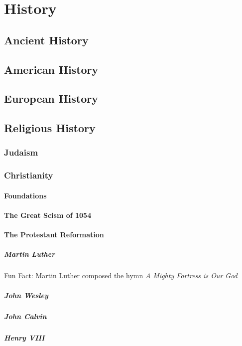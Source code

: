 \chapter{History}
	\section{Ancient History}
		
	\section{American History}
	\section{European History}
	\section{Religious History}
		\subsection{Judaism}
		\subsection{Christianity}
			\subsubsection{Foundations}
			\subsubsection{The Great Scism of 1054}
			\subsubsection{The Protestant Reformation}
				\paragraph{Martin Luther}
					Fun Fact: Martin Luther composed the hymn \textit{A Mighty Fortress is Our God}
				\paragraph{John Wesley}
				\paragraph{John Calvin}
				\paragraph{Henry VIII}
				
